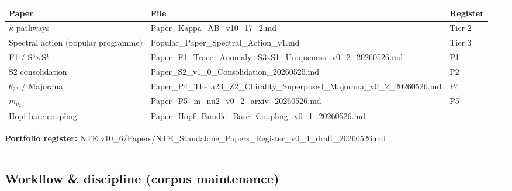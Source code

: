 \documentclass[
  11pt,
]{article}
\newcounter{none} %
\begin{document}
{\def\LTcaptype{none} %
\begin{longtable}[]{@{}
  >{\raggedright\arraybackslash}p{}
  >{\raggedright\arraybackslash}p{}
  >{\raggedright\arraybackslash}p{}@{}}
\toprule\noalign{}
\begin{minipage}[b]{\linewidth}\raggedright
Paper
\end{minipage} & \begin{minipage}[b]{\linewidth}\raggedright
File
\end{minipage} & \begin{minipage}[b]{\linewidth}\raggedright
Register
\end{minipage} \\
\midrule\noalign{}
\endhead
\bottomrule\noalign{}
\endlastfoot
\(\kappa\) pathways & Paper\_Kappa\_AB\_v10\_17\_2.md & Tier 2 \\
Spectral action (popular programme) &
Popular\_Paper\_Spectral\_Action\_v1.md & Tier 3 \\
F1 / S³×S¹ &
Paper\_F1\_Trace\_Anomaly\_S3xS1\_\newline Uniqueness\_v0\_2\_20260526.md
& P1 \\
S2 consolidation & Paper\_S2\_v1\_0\_Consolidation\_20260525.md & P2 \\
\(\theta_{23}\) / Majorana &
Paper\_P4\_Theta23\_Z2\_Chirality\_\newline Superposed\_Majorana\_v0\_2\_20260526.md
& P4 \\
\(m_{\nu_2}\) & Paper\_P5\_m\_nu2\_v0\_2\_arxiv\_20260526.md & P5 \\
Hopf bare coupling &
Paper\_Hopf\_Bundle\_Bare\_Coupling\_\newline v0\_1\_20260526.md &
--- \\
\end{longtable}
}

\textbf{Portfolio register:} NTE
v10\_6/Papers/NTE\_Standalone\_Papers\_Register\_v0\_4\_draft\_20260526.md

\begin{center}\rule{0.5\linewidth}{0.5pt}\end{center}

\subsection{Workflow \& discipline (corpus
maintenance)}\label{workflow-discipline-corpus-maintenance}
\end{document}
